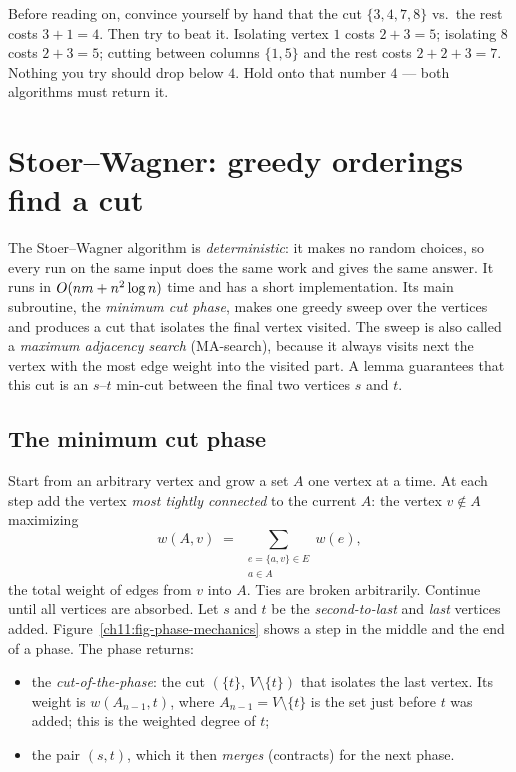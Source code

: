 \begin{labbox}
Before reading on, convince yourself by hand that the cut $\{3,4,7,8\}$ vs.\ the rest costs $3+1=4$. Then try to beat it. Isolating vertex $1$ costs $2+3=5$; isolating $8$ costs $2+3=5$; cutting between columns $\{1,5\}$ and the rest costs $2+2+3=7$. Nothing you try should drop below $4$. Hold onto that number $4$ --- both algorithms must return it.
\end{labbox}

\section{Stoer--Wagner: greedy orderings find a cut}

The Stoer--Wagner algorithm is \emph{deterministic}: it makes no random choices, so every run on the same input does the same work and gives the same answer. It runs in $O(nm + n^2\log n)$ time and has a short implementation. Its main subroutine, the \emph{minimum cut phase}, makes one greedy sweep over the vertices and produces a cut that isolates the final vertex visited. The sweep is also called a \emph{maximum adjacency search} (MA-search), because it always visits next the vertex with the most edge weight into the visited part. A lemma guarantees that this cut is an $s$--$t$ min-cut between the final two vertices $s$ and $t$.

\subsection{The minimum cut phase}

Start from an arbitrary vertex and grow a set $A$ one vertex at a time. At each step add the vertex \emph{most tightly connected} to the current $A$: the vertex $v\notin A$ maximizing
\[
  w(A,v) \;=\; \sum_{\substack{e=\{a,v\}\in E\\ a\in A}} w(e),
\]
the total weight of edges from $v$ into $A$. Ties are broken arbitrarily. Continue until all vertices are absorbed. Let $s$ and $t$ be the \emph{second-to-last} and \emph{last} vertices added. Figure~\ref{ch11:fig-phase-mechanics} shows a step in the middle and the end of a phase. The phase returns:
\begin{itemize}
  \item the \emph{cut-of-the-phase}: the cut $(\{t\},\,V\setminus\{t\})$ that isolates the last vertex. Its weight is $w(A_{n-1},t)$, where $A_{n-1}=V\setminus\{t\}$ is the set just before $t$ was added; this is the weighted degree of $t$;
  \item the pair $(s,t)$, which it then \emph{merges} (contracts) for the next phase.
\end{itemize}


